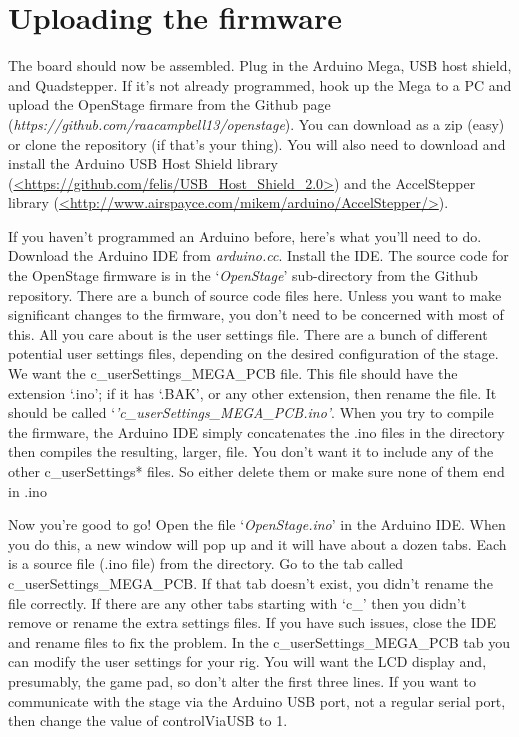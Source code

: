 \documentclass[11pt]{report} %
\begin{document}
\section{Uploading the firmware}
The board should now be assembled. Plug in the Arduino Mega, USB host shield, and Quadstepper. If it's not already programmed, hook up the Mega to a PC and upload the OpenStage firmare from the Github page (\textit{https://github.com/raacampbell13/openstage}). You can download as a zip (easy) or clone the repository (if that's your thing). You will also need to download and install the Arduino USB Host Shield library (\url{<https://github.com/felis/USB_Host_Shield_2.0>}) and the AccelStepper library (\url{<http://www.airspayce.com/mikem/arduino/AccelStepper/>}).

If you haven't programmed an Arduino before, here's what you'll need to do. Download the Arduino IDE from \textit{arduino.cc}. Install the IDE. The source code for the OpenStage firmware is in the `\textit{OpenStage}' sub-directory from the Github repository. There are a bunch of source code files here. Unless you want to make significant changes to the firmware, you don't need to be concerned with most of this. All you care about is the user settings file. There are a bunch of different potential user settings files, depending on the desired configuration of the stage. We want the c\_userSettings\_MEGA\_PCB file. This file should have the extension `.ino'; if it has `.BAK', or any other extension, then rename the file. It should be called `\textit{'c\_userSettings\_MEGA\_PCB.ino'}. When you try to compile the firmware, the Arduino IDE simply concatenates the .ino files in the directory then compiles the resulting, larger, file. You don't want it to include any of the other c\_userSettings* files. So either delete them or make sure none of them end in .ino 

Now you're good to go! Open the file `\textit{OpenStage.ino}' in the Arduino IDE. When you do this, a new window will pop up and it will have about a dozen tabs. Each is a source file (.ino file) from the directory. Go to the tab called c\_userSettings\_MEGA\_PCB. If that tab doesn't exist, you didn't rename the file correctly. If there are any other tabs starting with `c\_' then you didn't remove or rename the extra settings files. If you have such issues, close the IDE and rename files to fix the problem. In the c\_userSettings\_MEGA\_PCB tab you can modify the user settings for your rig. You will want the LCD display and, presumably, the game pad, so don't alter the first three lines. If you want to communicate with the stage via the Arduino USB port, not a regular serial port, then change the value of controlViaUSB to 1. 
\end{document}
